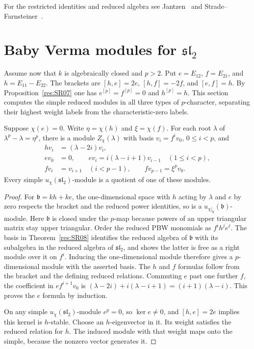 For the restricted identities and reduced algebra see
Jantzen~\cite[Sections A.1--A.3 and A.7, PDF pp.~1--3 and 4--5]{jantzen-modular}
and Strade--Farnsteiner~\cite[Sections 2.1, 2.5 and 5.3]{stradefarnsteiner}.

\section{Baby Verma modules for \texorpdfstring{\(\mathfrak{sl}_2\)}{sl(2)}}

Assume now that \(k\) is algebraically closed and \(p>2\).
Put \(e=E_{12}\), \(f=E_{21}\), and \(h=E_{11}-E_{22}\).
The brackets are \([h,e]=2e\), \([h,f]=-2f\), and
\([e,f]=h\). By Proposition~\ref{res:SR07} one has
\(e^{[p]}=f^{[p]}=0\) and \(h^{[p]}=h\).
This section computes the simple reduced modules in all
three types of \(p\)-character, separating their highest
weight labels from the characteristic-zero labels.

\begin{proposition}
\label{res:SR10}
Suppose \(\chi(e)=0\). Write \(\eta=\chi(h)\) and
\(\xi=\chi(f)\). For each root \(\lambda\) of
\(\lambda^p-\lambda=\eta^p\), there is a module \(Z_\chi(\lambda)\)
with basis \(v_i=f^i v_0\), \(0\le i<p\), and
\[
\begin{aligned}
 hv_i&=(\lambda-2i)v_i,\\
 ev_0&=0,\qquad ev_i=i(\lambda-i+1)v_{i-1}\quad(1\le i<p),\\
 fv_i&=v_{i+1}\quad(i<p-1),\qquad fv_{p-1}=\xi^p v_0.
\end{aligned}
\]
Every simple \(u_\chi(\mathfrak{sl}_2)\)-module is a
quotient of one of these modules.
\end{proposition}

\begin{proof}
For \(\mathfrak b=k h+k e\), the one-dimensional space
with \(h\) acting by \(\lambda\) and \(e\) by zero respects
the bracket and the reduced power identities, so is a
\(u_{\chi|_{\mathfrak b}}(\mathfrak b)\)-module. Here
\(\mathfrak b\) is closed under the \(p\)-map because powers
of an upper triangular matrix stay upper triangular.
Order the reduced PBW monomials as \(f^i h^j e^\ell\).
The basis in Theorem~\ref{res:SR08} identifies the reduced
algebra of \(\mathfrak b\) with its subalgebra in the
reduced algebra of \(\mathfrak{sl}_2\), and shows the
latter is free as a right module over it on \(f^i\).
Inducing the one-dimensional module therefore gives a
\(p\)-dimensional module with the asserted basis.
The \(h\) and \(f\) formulas follow from the bracket
and the defining reduced relations. Commuting \(e\)
past one further \(f\), the coefficient in
\(e f^{i+1}v_0\) is
\((\lambda-2i)+i(\lambda-i+1)=(i+1)(\lambda-i)\).
This proves the \(e\) formula by induction.

On any simple \(u_\chi(\mathfrak{sl}_2)\)-module \(e^p=0\), so
\(\ker e\ne0\), and \([h,e]=2e\) implies this kernel
is \(h\)-stable. Choose an \(h\)-eigenvector in it.
Its weight satisfies the reduced relation for \(h\).
The induced module with that weight maps onto the simple,
because the nonzero vector generates it.
\end{proof}

